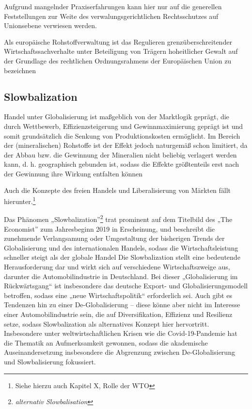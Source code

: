 \documentclass[12pt,a4paper,oneside]{book} %
\begin{document}
	Aufgrund mangelnder Praxiserfahrungen kann hier nur auf die generellen Feststellungen zur Weite des verwalungsgerichtlichen Rechtsschutzes auf Unionsebene verwiesen werden.
	
	
	\glqq Als europäische Rohstoffverwaltung ist das Regulieren grenzüberschreitender Wirtschaftssachverhalte unter Beteiligung von Trägern hoheitlicher Gewalt auf der Grundlage des rechtlichen Ordnungsrahmens der Europäischen Union zu bezeichnen\grqq \autocite{Schorkopf, Europäische Rohstoffverwaltung, Rn. 2}
	
	\subsection{Slowbalization}
	Handel unter Globalisierung ist maßgeblich von der Marktlogik geprägt, die durch Wettbewerb, Effizienzsteigerung und Gewinnmaximierung geprägt ist und somit grundsätzlich die Senkung von Produktionskosten ermöglicht. Im Bereich der (mineralischen) Rohstoffe ist der Effekt jedoch naturgemäß schon limitiert, da der Abbau bzw. die Gewinnung der Mineralien nicht beliebig verlagert werden kann, d. h. geographisch gebunden ist, sodass die Effekte größtenteils erst nach der Gewinnung ihre Wirkung entfalten können 
	
	Auch die Konzepte des freien Handels und Liberalisierung von Märkten fällt hierunter.\footnote{Siehe hierzu auch Kapitel X, Rolle der WTO}
	
	Das Phänomen „Slowbalization”\footnote{\textit{alternativ Slowbalisation}} trat prominent auf dem Titelbild des „The Economist” zum Jahresbeginn 2019\autocite{economist_slowbalisation_2019} in Erscheinung, und beschreibt die zunehmende Verlangsamung oder Umgestaltung der bisherigen Trends der Globalisierung und des internationalen Handels, sodass die Wirtschaftsleistung schneller steigt als der globale Handel%
	Die Slowbalization stellt eine bedeutende Herausforderung dar und wirkt sich auf verschiedene Wirtschaftszweige aus, darunter die Automobilindustrie in Deutschland. Bei dieser „Globalisierung im Rückwärtsgang“ ist insbesondere das deutsche Export- und Globalisierungsmodell betroffen, sodass eine „neue Wirtschaftspolitik“ erforderlich sei.\autocite{maier_globalisierung_2019} Auch gibt es Tendenzen hin zu einer De-Globalisierung – diese könne aber nicht im Interesse einer Automobilindustrie sein, die auf Diversifikation, Effizienz und Resilienz setze,\autocite{rade_globalisierung_2022} sodass Slowbalization als alternatives Konzept hier hervortritt. Insbesondere unter weltwirtschaftlichen Krisen wie die Covid-19-Pandemie hat die Thematik an Aufmerksamkeit gewonnen, sodass die akademische Auseinandersetzung insbesondere die Abgrenzung zwischen De-Globalisierung und Slowbalisierung fokussiert.\autocites{dalla_longa_urban_2023}{inferrera_globalisation_2021}
	
\end{document}
